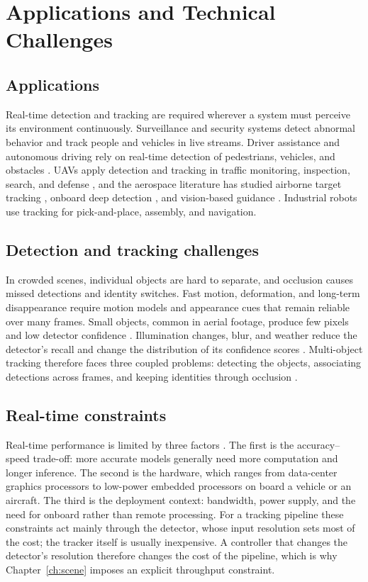 \section{Applications and Technical Challenges}\label{sec:bg-challenges}

\subsection{Applications}
Real-time detection and tracking are required wherever a system must perceive its environment continuously. Surveillance and security systems detect abnormal behavior and track people and vehicles in live streams. Driver assistance and autonomous driving rely on real-time detection of pedestrians, vehicles, and obstacles \cite{geiger2012kitti}. UAVs apply detection and tracking in traffic monitoring, inspection, search, and defense \cite{zhu2022visdrone,bakirci2025lowpower}, and the aerospace literature has studied airborne target tracking \cite{miller2015multitarget,desai2017uavfeature}, onboard deep detection \cite{lu2024uavdetection,choi2022docking}, and vision-based guidance \cite{parsons2019refueling}. Industrial robots use tracking for pick-and-place, assembly, and navigation.

\subsection{Detection and tracking challenges}
In crowded scenes, individual objects are hard to separate, and occlusion causes missed detections and identity switches. Fast motion, deformation, and long-term disappearance require motion models and appearance cues that remain reliable over many frames. Small objects, common in aerial footage, produce few pixels and low detector confidence \cite{cheng2023smallobject}. Illumination changes, blur, and weather reduce the detector's recall and change the distribution of its confidence scores \cite{chae2024radar}. Multi-object tracking therefore faces three coupled problems: detecting the objects, associating detections across frames, and keeping identities through occlusion \cite{li2025motreview}.

\subsection{Real-time constraints}
Real-time performance is limited by three factors \cite{bakirci2025lowpower}. The first is the accuracy--speed trade-off: more accurate models generally need more computation and longer inference. The second is the hardware, which ranges from data-center graphics processors to low-power embedded processors on board a vehicle or an aircraft. The third is the deployment context: bandwidth, power supply, and the need for onboard rather than remote processing. For a tracking pipeline these constraints act mainly through the detector, whose input resolution sets most of the cost; the tracker itself is usually inexpensive. A controller that changes the detector's resolution therefore changes the cost of the pipeline, which is why Chapter~\ref{ch:scene} imposes an explicit throughput constraint.

